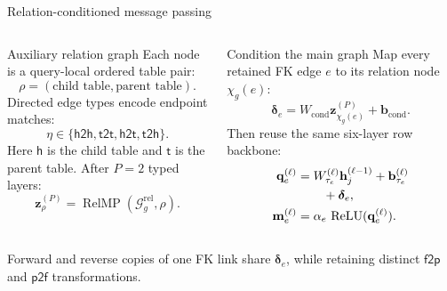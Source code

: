\documentclass[aspectratio=169,10pt,t]{beamer}
\begin{document}
\begin{frame}{Relation-conditioned message passing}
  \begin{columns}[T,onlytextwidth]
      \vspace{0pt}
      \begin{block}{Auxiliary relation graph}
        Each node is a query-local ordered table pair:
        \[
          \rho=(\text{child table},\text{parent table}).
        \]
        Directed edge types encode endpoint matches:
        \[
          \eta\in\{\mathsf{h2h},\mathsf{t2t},\mathsf{h2t},\mathsf{t2h}\}.
        \]
        Here $\mathsf h$ is the child table and $\mathsf t$ is the parent table. After $P=2$ typed layers:
        \[
          \mathbf z_\rho^{(P)}=\operatorname{RelMP}(\mathcal G_g^{\mathrm{rel}},\rho).
        \]
      \end{block}

      \vspace{0pt}
      \begin{alertblock}{Condition the main graph}
        Map every retained FK edge $e$ to its relation node $\chi_g(e)$:
        \[
          \bm\delta_e
          =W_{\mathrm{cond}}\mathbf z_{\chi_g(e)}^{(P)}+\mathbf b_{\mathrm{cond}}.
        \]
        Then reuse the same six-layer row backbone:
        \[
        \begin{aligned}
          \mathbf q_e^{(\ell)}
          &=W_{\tau_e}^{(\ell)}\mathbf h_j^{(\ell-1)}
            +\mathbf b_{\tau_e}^{(\ell)}\\[-.1em]
          &\hspace{2.1em}+\bm\delta_e,\\
          \mathbf m_e^{(\ell)}
          &=\alpha_e\,\operatorname{ReLU}(\mathbf q_e^{(\ell)}).
        \end{aligned}
        \]
      \end{alertblock}
  \end{columns}
  \vspace{.15cm}
  \centering\small
  Forward and reverse copies of one FK link share $\bm\delta_e$, while retaining distinct $\mathsf{f2p}$ and $\mathsf{p2f}$ transformations.
\end{frame}
\end{document}
